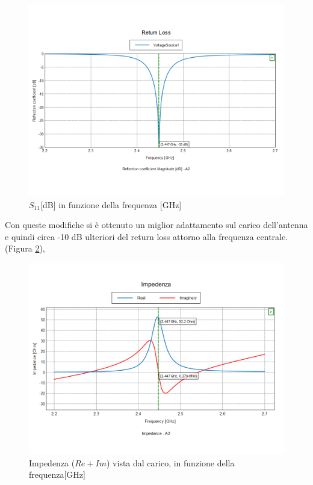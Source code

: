 \documentclass[twoside,twocolumn]{article}
\begin{document}
\begin{figure}[h!]
  \includegraphics[width=\linewidth]{A1_S11.png}
  \caption{$S_{11} $[dB] in funzione della frequenza [GHz] }
  \label{fig:A1_S11}
\end{figure}
Con queste modifiche si è ottenuto un miglior adattamento sul carico dell'antenna e quindi circa -10 dB ulteriori del return loss attorno alla frequenza centrale. (Figura \ref{fig:A1_impedenza}),
 \begin{figure}[h!]
  \includegraphics[width=\linewidth]{A1_impedenza.png}
  \caption{Impedenza ($Re +Im$) vista dal carico, in funzione della frequenza[GHz]}
  \label{fig:A1_impedenza}
\end{figure}
\end{document}
